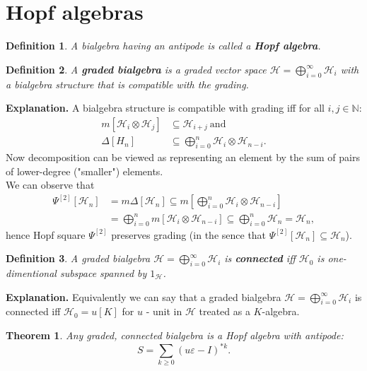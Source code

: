 \documentclass[a4paper, 12pt]{report}
\newtheorem{definition}{Definition}
\newtheorem{theorem}{Theorem}
\begin{document}
\section{Hopf algebras}
\begin{definition}
A bialgebra having an antipode is called a \textbf{Hopf algebra}.
\end{definition}
\begin{definition}
A \textbf{graded bialgebra} is a graded vector space
$\mathcal{H} = \displaystyle\bigoplus^{\infty}_{i=0}\mathcal{H}_i$ with a bialgebra structure that is
compatible with the grading.
\end{definition}
\textbf{Explanation. } A bialgebra structure is compatible with grading iff for all $i, j \in \mathbb{N}$:
\begin{align*}
m[\mathcal{H}_i \otimes \mathcal{H}_j] &\subseteq \mathcal{H}_{i+j} \mathrm{\ and} \\
\Delta[H_n] &\subseteq \bigoplus^{n}_{i = 0} \mathcal{H}_i \otimes \mathcal{H}_{n-i}.
\end{align*}
\indent Now decomposition can be viewed as representing an element by the sum of pairs of lower-degree
("smaller") elements. \\
\indent We can observe that
\begin{align*}
\Psi^{[2]}[\mathcal{H}_n] &= m\Delta[\mathcal{H}_n] \subseteq m[\bigoplus^n_{i = 0} \mathcal{H}_i \otimes
\mathcal{H}_{n - i}] \\ &= \bigoplus^n_{i = 0} m[\mathcal{H}_i \otimes \mathcal{H}_{n - i}] \subseteq
\bigoplus^n_{i = 0} \mathcal{H}_n = \mathcal{H}_n,
\end{align*}
hence Hopf square $\Psi^{[2]}$ preserves grading
(in the sence that $\Psi^{[2]}[\mathcal{H}_n] \subseteq \mathcal{H}_n$).
\begin{definition}
A graded bialgebra $\mathcal{H} = \displaystyle\bigoplus^{\infty}_{i=0}\mathcal{H}_i$ is
\textbf{connected} iff $\mathcal{H}_0$ is one-dimentional subspace spanned by $1_\mathcal{H}$.
\end{definition}
\noindent \textbf{Explanation. } Equivalently we can say that a graded bialgebra
$\mathcal{H} = \displaystyle\bigoplus^{\infty}_{i=0}\mathcal{H}_i$ is
connected iff $\mathcal{H}_0 = u[K]$ for $u$ - unit in $\mathcal{H}$ treated as a $K$-algebra.
\begin{theorem}
Any graded, connected bialgebra is a Hopf algebra with antipode:
\begin{equation*}
S = \sum_{k \geq 0} (u\varepsilon - I)^{*k}.
\end{equation*}
\end{theorem}
\end{document}
